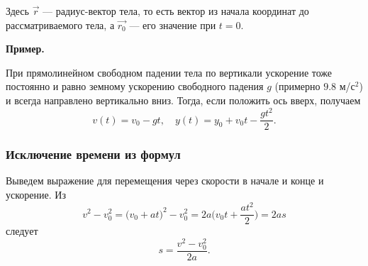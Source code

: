 \documentclass[12pt, a4paper]{article}%
\begin{document}
Здесь $\vec{r}$ --- радиус-вектор тела, то есть вектор из начала координат до рассматриваемого тела, а $\vec{r_0}$
--- его значение при $t = 0$.

\textbf{Пример.}

При прямолинейном свободном падении тела по вертикали ускорение тоже постоянно и равно земному ускорению свободного падения $g$ (примерно $9.8$ м/с$^2$) и всегда направлено вертикально вниз. Тогда, если положить ось вверх, получаем
\[
v(t) = v_{0} - gt,\quad
y(t) = y_{0} + v_{0}t - \frac{gt^{2}}{2}.
\]

\subsubsection*{Исключение времени из формул}

Выведем выражение для перемещения через скорости в начале и конце и ускорение. Из
\[
v^{2} - v_{0}^{2} = \bigl(v_{0} + at\bigr)^{2} - v_{0}^{2} = 2a\bigl(v_{0}t + \dfrac{at^{2}}{2}\bigr) = 2as
\]
следует
\[
s = \frac{v^{2} - v_{0}^{2}}{2a}.
\]
\end{document}

